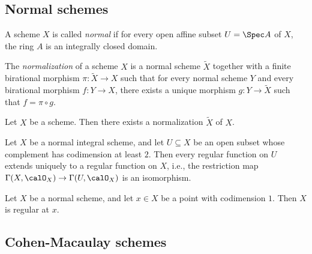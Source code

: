 \subsection{Normal schemes}

    \begin{definition}\label{def:normal_scheme}
        A scheme \(X\) is called \emph{normal} if for every open affine subset \(U = \Spec A\) of \(X\), the ring \(A\) is an integrally closed domain.
    \end{definition}

    \begin{definition}\label{def:normalization}
        The \emph{normalization} of a scheme \(X\) is a normal scheme \(\widetilde{X}\) together with a finite birational morphism \(\pi:\widetilde{X}\to X\) such that for every normal scheme \(Y\) and every birational morphism \(f:Y\to X\), there exists a unique morphism \(g:Y\to \widetilde{X}\) such that \(f = \pi \circ g\).
    \end{definition}

    \begin{theorem}\label{thm:existence_of_normalization}
        Let \(X\) be a scheme. Then there exists a normalization \(\widetilde{X}\) of \(X\).
    \end{theorem}

    \begin{theorem}\label{thm:Hartogs_phenomenon}
        Let \(X\) be a normal integral scheme, and let \(U\subseteq X\) be an open subset whose complement has codimension at least \(2\).
        Then every regular function on \(U\) extends uniquely to a regular function on \(X\), i.e., the restriction map \(\Gamma(X,\calO_X) \to \Gamma(U,\calO_X)\) is an isomorphism.
    \end{theorem}

    \begin{proposition}\label{prop:normal_scheme_is_regular_in_codimension_1}
        Let \(X\) be a normal scheme, and let \(x \in X\) be a point with codimension \(1\). Then \(X\) is regular at \(x\).
    \end{proposition}

\subsection{Cohen-Macaulay schemes}


